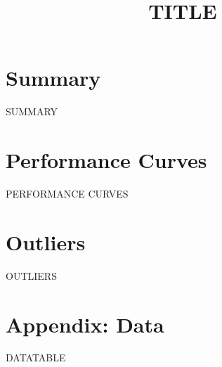 \documentclass{article}
\title{TITLE}
\begin{document}
\maketitle

\setcounter{section}{-1}
\section{Summary}
SUMMARY

\section{Performance Curves}
PERFORMANCE CURVES

\section{Outliers}
OUTLIERS

\section{Appendix: Data}
DATATABLE
\end{document}
